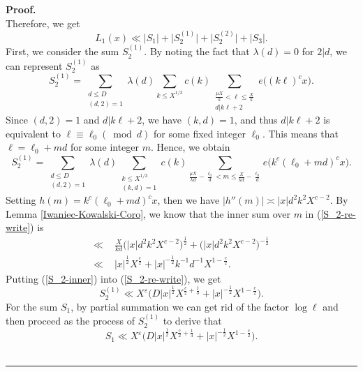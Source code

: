 \documentclass[a4paper,oneside,11pt]{article}%
\newenvironment{proof}[1][Proof]{\noindent \textbf{#1.} }{\  \rule{0.5em}{0.5em}}
\numberwithin{equation}{section}
\begin{document}
\begin{proof}
\begin{equation*}
\end{equation*}
Therefore, we get
\begin{equation*}
 L_1(x)\ll \big|S_1\big|+\big|S_2^{(1)}\big|+\big|S_2^{(2)}\big|+\big|S_3\big|.
\end{equation*}
First, we consider the sum $S_2^{(1)}$. By noting the fact that $\lambda(d)=0$ for $2|d$, we can represent $S_2^{(1)}$ as
\begin{equation*}
 S_2^{(1)}=\sum_{\substack{d\leqslant D\\ (d,2)=1}}\lambda(d)\sum_{k\leqslant X^{1/3}}c(k)
  \sum_{\substack{\frac{\mu X}{k}<\ell\leqslant\frac{X}{k}\\ d|k\ell+2}}e\big((k\ell)^cx\big).
\end{equation*}
Since $(d,2)=1$ and $d|k\ell+2$, we have $(k,d)=1$, and thus $d|k\ell+2$ is equivalent to $\ell\equiv\ell_0(\bmod d)$ for some
fixed integer $\ell_0$. This means that $\ell=\ell_0+md$ for some integer $m$. Hence, we obtain
\begin{equation}\label{S_2-re-write}
 S_2^{(1)}=\sum_{\substack{d\leqslant D\\ (d,2)=1}}\lambda(d)\sum_{\substack{k\leqslant X^{1/3}\\(k,d)=1}}c(k)
  \sum_{\frac{\mu X}{kd}-\frac{\ell_0}{d}<m\leqslant\frac{X}{kd}-\frac{\ell_0}{d}}e\big(k^c(\ell_0+md)^cx\big).
\end{equation}
Setting $h(m)=k^c(\ell_0+md)^cx$, then we have $|h''(m)|\asymp|x|d^2k^2X^{c-2}$. By Lemma \ref{Iwaniec-Kowalski-Coro}, we know that the inner sum over $m$ in (\ref{S_2-re-write}) is
\begin{align}\label{S_2-inner}
  \ll & \,\, \frac{X}{kd}\big(|x|d^2k^2X^{c-2}\big)^{\frac{1}{2}}+\big(|x|d^2k^2X^{c-2}\big)^{-\frac{1}{2}}
                \nonumber \\
  \ll & \,\, |x|^\frac{1}{2}X^{\frac{c}{2}}+|x|^{-\frac{1}{2}}k^{-1}d^{-1}X^{1-\frac{c}{2}}.
\end{align}
Putting (\ref{S_2-inner}) into (\ref{S_2-re-write}), we get
\begin{equation}\label{S_2-upper}
  S_2^{(1)}\ll X^\varepsilon\Big(D|x|^\frac{1}{2}X^{\frac{c}{2}+\frac{1}{3}}+|x|^{-\frac{1}{2}}X^{1-\frac{c}{2}}\Big).
\end{equation}
For the sum $S_1$, by partial summation we can get rid of the factor $\log\ell$ and then proceed as the process of $S_2^{(1)}$
to derive that
\begin{equation}\label{S_1-upper}
  S_1\ll X^\varepsilon\Big(D|x|^\frac{1}{2}X^{\frac{c}{2}+\frac{1}{3}}+|x|^{-\frac{1}{2}}X^{1-\frac{c}{2}}\Big).

\end{equation}
\end{proof}
\end{document}
